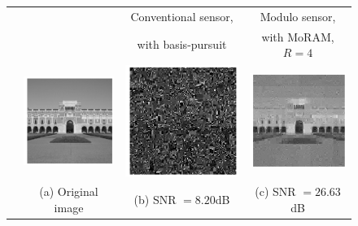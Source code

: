 \begin{figure}[t!]
	\begin{center}
		\setlength{\tabcolsep}{0pt}
		\renewcommand{\arraystretch}{0.5}
		\begin{tabular}{cccc}
			& & Conventional sensor, & Modulo sensor,\\
			& & with basis-pursuit & with MoRAM, $R=4$  \\
			\rotatebox{90}{$~~~~~~~m=4000$} &
			\includegraphics[width=0.32\linewidth]{./fig/lovett_original.pdf} &
			\includegraphics[width=0.32\linewidth]{./fig/lovett_r4_clip_4000.pdf} & 
			\includegraphics[width=0.32\linewidth]{./fig/lovett_r4_m_4000_s_800.pdf}  \\
			& \small{(a) Original image}& \small{(b) SNR $=8.20$dB}& %
			\small{(c) SNR $=26.63$dB} \\
			

\end{tabular}
\end{center}
\end{figure}
